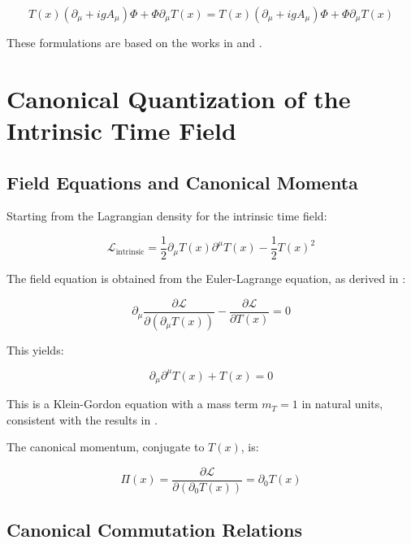 \documentclass[12pt,a4paper]{article}
\newcommand{\Tfield}{T(x)}
\newcommand{\DhiggsT}{\Tfield (\partial_\mu + ig A_\mu) \Phi + \Phi \partial_\mu \Tfield}
\newcommand{\calL}{\mathcal{L}}
\begin{document}
	\begin{equation}
		\DhiggsT = \Tfield(\partial_{\mu} + igA_{\mu})\Phi + \Phi\partial_{\mu}\Tfield
	\end{equation}
	
	These formulations are based on the works in \cite{pascher_formalismen_2025_en} and \cite{pascher_higgs_2025_en}.
	
	\section{Canonical Quantization of the Intrinsic Time Field}
	\label{sec:kanonische_quantisierung}
	
	\subsection{Field Equations and Canonical Momenta}
	\label{sec:feldgleichungen}
	
	Starting from the Lagrangian density for the intrinsic time field:
	
	\begin{equation}
		\calL_{\text{intrinsic}} = \frac{1}{2}\partial_{\mu}\Tfield\partial^{\mu}\Tfield - \frac{1}{2}\Tfield^2
	\end{equation}
	
	The field equation is obtained from the Euler-Lagrange equation, as derived in \cite{pascher_lagrange_2025_en}:
	
	\begin{equation}
		\partial_{\mu}\frac{\partial\calL}{\partial(\partial_{\mu}\Tfield)} - \frac{\partial\calL}{\partial \Tfield} = 0
	\end{equation}
	
	This yields:
	
	\begin{equation}
		\partial_{\mu}\partial^{\mu}\Tfield + \Tfield = 0
	\end{equation}
	
	This is a Klein-Gordon equation with a mass term $m_T = 1$ in natural units, consistent with the results in \cite{pascher_feldtheorie_2025_en}.
	
	The canonical momentum, conjugate to $\Tfield$, is:
	
	\begin{equation}
		\Pi(x) = \frac{\partial\calL}{\partial(\partial_0 \Tfield)} = \partial_0 \Tfield
	\end{equation}
	
	\subsection{Canonical Commutation Relations}
	\label{sec:vertauschungsrelationen}
	
\end{document}
